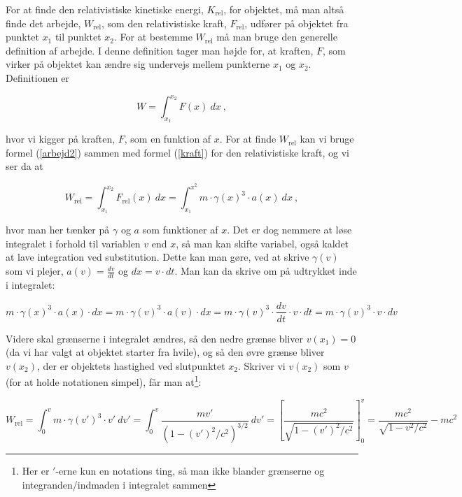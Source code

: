 For at finde den relativistiske kinetiske energi, $K_{\text{rel}}$, for objektet, må man altså finde det arbejde, $W_{\text{rel}}$, som den relativistiske kraft, $F_{\text{rel}}$, udfører på objektet fra punktet $x_1$ til punktet $x_2$. For at bestemme $W_{\text{rel}}$ må man bruge den generelle definition af arbejde. I denne definition tager man højde for, at kraften, $F$, som virker på objektet kan ændre sig undervejs mellem punkterne $x_1$ og $x_2$. Definitionen er

\begin{equation}
W = \int_{x_1}^{x_2} F(x) \ dx \ ,
\label{arbejd2}
\end{equation}

\vspace{2mm}

hvor vi kigger på kraften, $F$, som en funktion af $x$. For at finde $W_{\text{rel}}$ kan vi bruge formel (\ref{arbejd2}) sammen med formel (\ref{kraft}) for den relativistiske kraft, og vi ser da at

$$W_{\text{rel}} = \int_{x_1}^{x_2} F_{\text{rel}} (x) \ dx =  \int_{x_1}^{x^2} m \cdot \gamma (x)^3 \cdot a(x) \ dx \ ,$$

\vspace{2mm}

hvor man her tænker på $\gamma$ og $a$ som funktioner af $x$. Det er dog nemmere at løse integralet i forhold til variablen $v$ end $x$, så man kan skifte variabel, også kaldet at lave integration ved substitution. Dette kan man gøre, ved at skrive $\gamma(v)$ som vi plejer, $a(v) = \frac{dv}{dt}$ og $dx = v \cdot dt$. Man kan da skrive om på udtrykket inde i integralet:

$$m \cdot \gamma (x)^3 \cdot a(x) \cdot dx = m \cdot \gamma(v)^3 \cdot  a (v) \cdot dx = m \cdot \gamma(v)^3 \cdot \frac{dv}{dt} \cdot v \cdot dt = m \cdot \gamma(v)^3 \cdot v \cdot dv$$

\vspace{2mm}

Videre skal grænserne i integralet ændres, så den nedre grænse bliver $v(x_1) = 0$ (da vi har valgt at objektet starter fra hvile), og så den øvre grænse bliver $v(x_2)$, der er objektets hastighed ved slutpunktet $x_2$. Skriver vi $v(x_2)$ som $v$ (for at holde notationen simpel), får man at\footnote{Her er $'$-erne kun en notations ting, så man ikke blander grænserne og integranden/indmaden i integralet sammen}:

$$W_{\text{rel}} =  \int_{0}^{v} m \cdot \gamma (v')^3 \cdot v' \ dv' =  \int_{0}^{v}  \frac{mv'}{ \left( 1 - (v')^2 / c^2  \right)^{3/2}} \ dv' =  \left[ \frac{mc^2}{\sqrt{1 - (v')^2 / c^2}} \right]_0^v = \frac{m c^2}{ \sqrt{1 - v^2 / c^2}} - m c^2 $$

